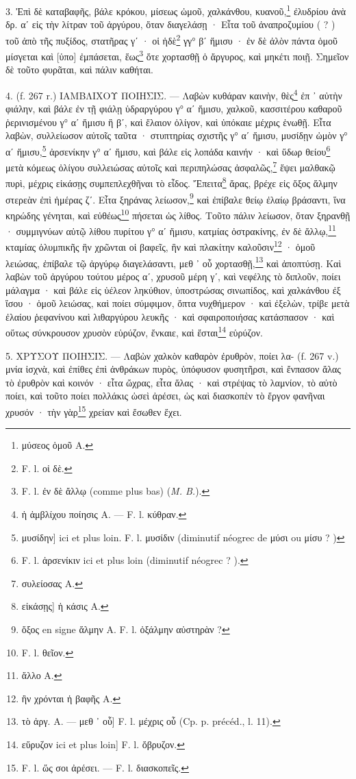 \documentclass[a4paper, 11pt, oneside, polutonikogreek, french]{article}
\begin{document}
3. Ἐπὶ δὲ καταβαφῆς, βάλε κρόκου, μίσεως ὠμοῦ, χαλκάνθου, κυανοῦ,\footnote{μύσεος ὁμοῦ A.} ἐλυδρίου ἀνὰ δρ. αʹ εἰς τὴν λίτραν τοῦ ἀργύρου, ὅταν διαγελάσῃ · Εἶτα τοῦ ἀναπροζυμίου ( ? ) τοῦ ἀπὸ τῆς πυξίδος, στατῆρας γʹ · οἱ ἡδὲ\footnote{F. l. οἰ δὲ.} γγ° βʹ ἥμισυ · ἐν δὲ ἀλὸν πάντα ὁμοῦ μίσγεται καὶ [ὑπο] ἐμπάσεται, ἕως\footnote{F. l. ἐν δὲ ἄλλῳ (comme plus bas) (\emph{M. B.}).} ὅτε χορτασθῇ ὁ ἄργυρος, καὶ μηκέτι ποιῇ. Σημεῖον δὲ τοῦτο φυρᾶται, καὶ πάλιν καθήται.

4. (f. 267 r.) ΙΑΜΒΛΙΧΟΥ ΠΟΙΗΣΙΣ. --- Λαβὼν κυθάραν καινὴν, θὲς\footnote{ἡ ἀμβλίχου ποίησις A. --- F. l. κύθραν.} ἐπ ᾽ αὐτὴν φιάλην, καὶ βάλε ἐν τῇ φιάλῃ ὑδραργύρου γ° αʹ ἥμισυ, χαλκοῦ, κασσιτέρου καθαροῦ ῥερινισμένου γ° αʹ ἥμισυ ἢ βʹ, καὶ ἔλαιον ὀλίγον, καὶ ὑπόκαιε μέχρις ἑνωθῇ. Εἶτα λαβὼν, συλλείωσον αὐτοῖς ταῦτα · στυπτηρίας σχιστῆς γ° αʹ ἥμισυ, μυσίδῃν ὠμὸν γ° αʹ ἥμισυ,\footnote{μυσίδην] ici et plus loin. F. l. μυσίδιν (diminutif néogrec de μύσι ou μίσυ ? )} ἀρσενίκην γ° αʹ ἥμισυ, καὶ βάλε εἰς λοπάδα καινήν · καὶ ὕδωρ θείου\footnote{F. l. ἀρσενίκιν ici et plus loin (diminutif néogrec ? ).} μετὰ κόμεως ὀλίγου συλλειώσας αὐτοῖς καὶ περιπηλώσας ἀσφαλῶς,\footnote{συλείοσας A.} ἕψει μαλθακῷ πυρὶ, μέχρις εἰκάσῃς συμπεπλεχθῆναι τὸ εἶδος. Ἔπειτα\footnote{εἰκάσῃς] ἡ κάσις A.} ἄρας, βρέχε εἰς ὄξος ἅλμην στερεὰν ἐπὶ ἡμέρας ζʹ. Εἶτα ξηράνας λείωσον,\footnote{ὄξος en signe ἅλμην A. F. l. ὀξάλμην αὐστηρὰν ?} καὶ ἐπίβαλε θείῳ ἐλαίῳ βράσαντι, ἵνα κηρώδης γένηται, καὶ εὐθέως\footnote{F. l. θεῖον.} πήσεται ὡς λίθος. Τοῦτο πάλιν λείωσον, ὅταν ξηρανθῇ · συμμιγνύων αὐτῷ λίθου πυρίτου γ° αʹ ἥμισυ, κατμίας ὀστρακίνης, ἐν δὲ ἄλλῳ,\footnote{ἄλλο A.} κταμίας ὀλυμπικῆς ἣν χρῶνται οἱ βαφεῖς, ἣν καὶ πλακίτην καλοῦσιν\footnote{ἢν χρόνται ἡ βαφῆς A.} · ὁμοῦ λειώσας, ἐπίβαλε τῷ ἀργύρῳ διαγελάσαντι, μεθ ᾽ οὗ χορτασθῇ,\footnote{τὸ ἀργ. A. --- μεθ ᾽ οὗ] F. l. μέχρις οὗ (Cp. p. précéd., l. 11).} καὶ ἀποπτύσῃ. Καὶ λαβὼν τοῦ ἀργύρου τούτου μέρος αʹ, χρυσοῦ μέρη γʹ, καὶ νεφέλης τὸ διπλοῦν, ποίει μάλαγμα · καὶ βάλε εἰς ὑέλεον ληκύθιον, ὑποστρώσας σινωπίδος, καὶ χαλκάνθου ἐξ ἴσου · ὁμοῦ λειώσας, καὶ ποίει σύμφιμον, ὄπτα νυχθήμερον · καὶ ἐξελὼν, τρίβε μετὰ ἐλαίου ῥεφανίνου καὶ λιθαργύρου λευκῆς · καὶ σφαιροποιήσας κατάσπασον · καὶ οὕτως σύνκρουσον χρυσὸν εὑρύζον, ἔνκαιε, καὶ ἔσται\footnote{εὕρυζον ici et plus loin] F. l. ὄβρυζον.} εὑρύζον.

5. ΧΡΥΣΟΥ ΠΟΙΗΣΙΣ. --- Λαβὼν χαλκὸν καθαρὸν ἐρυθρὸν, ποίει λα- (f. 267 v.) μνία ἰσχνὰ, καὶ ἐπίθες ἐπὶ ἀνθράκων πυρὸς, ὑπόφυσον φυσητῆρσι, καὶ ἔνπασον ἅλας τὸ ἐρυθρὸν καὶ κοινόν · εἶτα ὤχρας, εἶτα ἅλας · καὶ στρέψας τὸ λαμνίον, τὸ αὐτὸ ποίει, καὶ τοῦτο ποίει πολλάκις ὡσεὶ ἀρέσει, ὡς καὶ διασκοπὲν τὸ ἔργον φανῆναι χρυσόν · τὴν γὰρ\footnote{F. l. ὥς σοι ἀρέσει. --- F. l. διασκοπεῖς.} χρείαν καὶ ἔσωθεν ἔχει.
\end{document}
